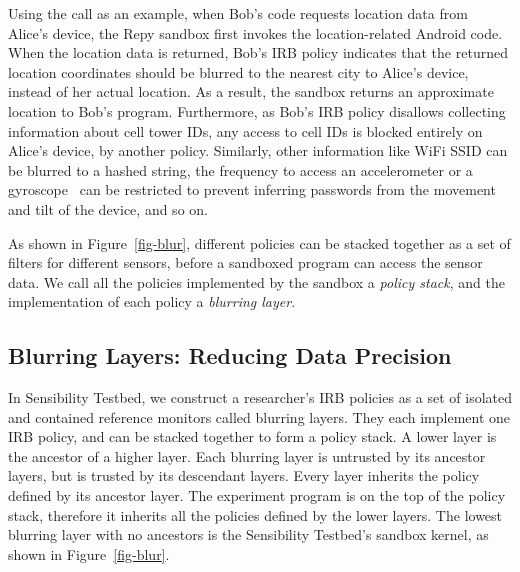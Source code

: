 Using the  call as an example, 
when Bob's code requests location data from Alice's device, the Repy sandbox first
invokes the location-related Android code. 
When the location data is returned, Bob's IRB policy
indicates that the returned location coordinates should be blurred to the nearest city to Alice's
device, instead of her actual location. As a result, the sandbox returns an approximate location to
Bob's program. Furthermore, as Bob's IRB policy disallows collecting information about cell tower
IDs, any access to cell IDs is blocked entirely on Alice's device, by another policy. Similarly, other information
like WiFi SSID can be blurred to a hashed string, the frequency to access an accelerometer or a
gyroscope~\cite{michalevsky2014gyrophone} can be restricted to prevent inferring passwords from the
movement and tilt of the device, and so on. 

As shown in Figure~\ref{fig-blur}, different policies
can be stacked together as a set of filters for different sensors, before a sandboxed program can
access the sensor data. We call all the policies implemented by the sandbox a \textit{policy stack}, 
and the implementation of each policy a \textit{blurring layer}.

\subsection{Blurring Layers: Reducing Data Precision}\label{sec-layer}


In Sensibility Testbed, we construct a researcher's IRB policies as a set of 
isolated and contained reference monitors called blurring layers. They each
implement one IRB policy, and can 
be stacked together to form a policy stack. A lower layer is the ancestor of 
a higher layer. Each blurring layer is untrusted by its ancestor layers, 
but is trusted by its descendant layers. Every layer inherits the policy 
defined by its ancestor layer. The experiment program is on the top 
of the policy stack, therefore it inherits all the policies defined by the
lower layers. The lowest blurring layer with no ancestors is the 
Sensibility Testbed's sandbox kernel, as shown in Figure~\ref{fig-blur}. 


